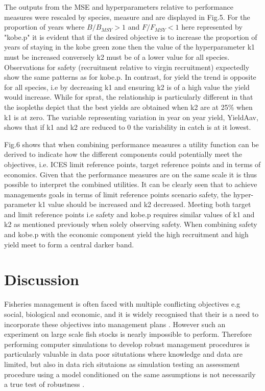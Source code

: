 \documentclass[preprint,review,12pt]{elsarticle}
\begin{document}
The outputs from the MSE and hyperparameters relative to performance measures were rescaled by species, measure and are displayed in Fig.5. For the proportion of years where $B/B_{MSY} > 1$ and $F/F_{MSY} < 1$ here represented by "kobe.p" it is evident that if the desired objective is to increase the proportion of years of staying in the kobe green zone then the value of the hyperparameter k1 must be increased conversely k2 must be of a lower value for all species. Observations for safety (recruitment relative to virgin recruitment) expectedly show the same patterns as for kobe.p. In contrast, for yield the trend is opposite for all species, i.e by decreasing k1 and ensuring k2 is of a high value the yield would increase. While for sprat, the relationship is particularly different in that the isopleths depict that the best yields are obtained when k2 are at 25\% when k1 is at zero. The variable representing variation in year on year yield, YieldAav, shows that if k1 and k2 are reduced to 0 the variability in catch is at it lowest. 

Fig.6 shows that when combining performance measures a utility function can be derived to indicate how the different components could potentially meet the objectives, i.e. ICES limit reference points, target reference points and in terms of economics. Given that the performance measures are on the same scale it is thus possible to interpret the combined utilities. It can be clearly seen that to achieve managements goals in terms of limit reference points scenario safety, the hyper-parameter k1 value should be increased and k2 decreased. Meeting both target and limit reference points i.e safety and kobe.p requires similar values of k1 and k2 as mentioned previously when solely observing safety. When combining safety and kobe.p with the economic component yield the high recruitment and high yield meet to form a central darker band. 



\section{Discussion}

Fisheries management is often faced with multiple conflicting objectives e.g social, biological and economic, and it is widely recognised that their is a need to incorporate these objectives into management plans \cite{rindorf2017inclusion}. However such an experiment on large scale fish stocks is nearly impossible to perform.  Therefore performing computer simulations to develop robust management procedures is particularly valuable in data poor situtations where knowledge and data are limited, but also in data rich situtaions as simulation testing an assessment procedure using a model conditioned on the same assumptions is not necessarily a true test of robustness \cite{geromont2014generic}.  
\end{document}
